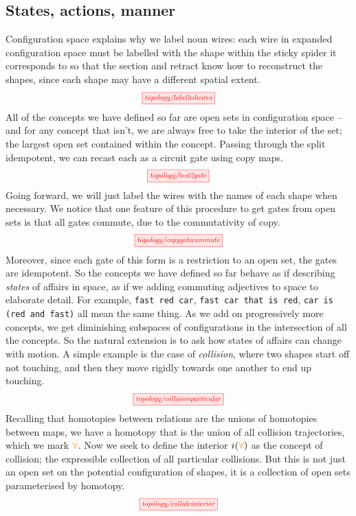\begin{fullwidth}
\subsection{States, actions, manner}\label{sec:statesactions}

Configuration space explains why we label noun wires: each wire in expanded configuration space must be labelled with the shape within the sticky spider it corresponds to so that the section and retract know how to reconstruct the shapes, since each shape may have a different spatial extent.
\[\scalebox{0.75}{\tikzfig{topology/labelledwires}}\]
All of the concepts we have defined so far are open sets in configuration space -- and for any concept that isn't, we are always free to take the interior of the set; the largest open set contained within the concept. Passing through the split idempotent, we can recast each as a circuit gate using copy maps.
\[\scalebox{0.75}{\tikzfig{topology/test2gate}}\]
Going forward, we will just label the wires with the names of each shape when necessary. We notice that one feature of this procedure to get gates from open sets is that all gates commute, due to the commutativity of copy.
\[\scalebox{0.75}{\tikzfig{topology/copygatecommute}}\]
Moreover, since each gate of this form is a restriction to an open set, the gates are idempotent. So the concepts we have defined so far behave as if describing \emph{states} of affairs in space, as if we adding commuting adjectives to space to elaborate detail. For example, \texttt{fast red car}, \texttt{fast car that is red}, \texttt{car is (red and fast)} all mean the same thing. As we add on progressively more concepts, we get diminishing subspaces of configurations in the intersection of all the concepts. So the natural extension is to ask how states of affairs can change with motion. A simple example is the case of \emph{collision}, where two shapes start off not touching, and then they move rigidly towards one another to end up touching.
\[\scalebox{0.75}{\tikzfig{topology/collisionparticular}}\]
Recalling that homotopies between relations are the unions of homotopies between maps, we have a homotopy that is the union of all collision trajectories, which we mark $\textcolor{orange}{\forall}$. Now we seek to define the interior $i(\textcolor{orange}{\forall})$ as the concept of collision; the expressible collection of all particular collisions. But this is not just an open set on the potential configuration of shapes, it is a collection of open sets parameterised by homotopy.
\[\scalebox{0.75}{\tikzfig{topology/collideinterior}}\]

\end{fullwidth}
